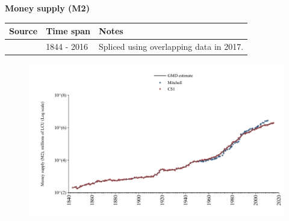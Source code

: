 \documentclass[12pt,a4paper,landscape]{article}
\begin{document}
\begin{adjustbox}{max totalsize={\paperwidth}{\paperheight},center}
\begin{minipage}[t][\textheight][t]{\textwidth}
\vspace*{0.5cm}
{}
\begin{center}
{\Large\bfseries Money supply (M2)}
\end{center}
\vspace{0.5cm}
\begin{table}[H]
\centering
\small
\begin{tabular}{|l|l|l|}
\hline
\textbf{Source} & \textbf{Time span} & \textbf{Notes} \\
\hline
\rowcolor{white}\cite{CS1_GBR}& 1844 - 2016 &Spliced using overlapping data in 2017. \\
\hline
\end{tabular}
\end{table}
\begin{figure}[H]
\centering
\includegraphics[width=\textwidth,height=0.6\textheight,keepaspectratio]{graphs/GBR_M2.pdf}
\end{figure}
\end{minipage}
\end{adjustbox}
\end{document}
